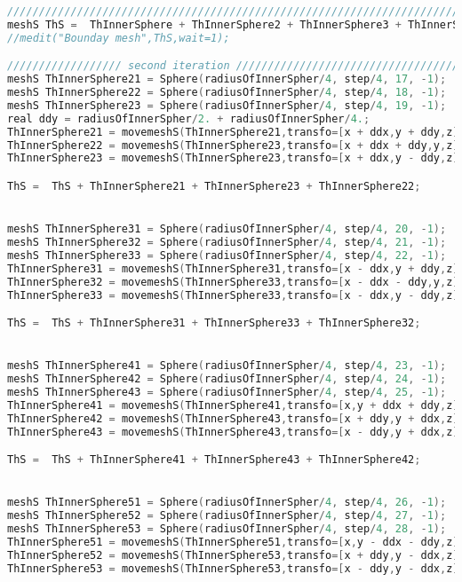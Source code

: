 \begin{lstlisting}[language=C]
/////////////////////////////////////////////////////////////////////////////
meshS ThS =  ThInnerSphere + ThInnerSphere2 + ThInnerSphere3 + ThInnerSphere4 + ThInnerSphere5;
//medit("Bounday mesh",ThS,wait=1);

////////////////// second iteration //////////////////////////////////////////////////////////
meshS ThInnerSphere21 = Sphere(radiusOfInnerSpher/4, step/4, 17, -1);
meshS ThInnerSphere22 = Sphere(radiusOfInnerSpher/4, step/4, 18, -1);
meshS ThInnerSphere23 = Sphere(radiusOfInnerSpher/4, step/4, 19, -1);
real ddy = radiusOfInnerSpher/2. + radiusOfInnerSpher/4.;
ThInnerSphere21 = movemeshS(ThInnerSphere21,transfo=[x + ddx,y + ddy,z]);
ThInnerSphere22 = movemeshS(ThInnerSphere23,transfo=[x + ddx + ddy,y,z]);
ThInnerSphere23 = movemeshS(ThInnerSphere23,transfo=[x + ddx,y - ddy,z]);

ThS =  ThS + ThInnerSphere21 + ThInnerSphere23 + ThInnerSphere22;


meshS ThInnerSphere31 = Sphere(radiusOfInnerSpher/4, step/4, 20, -1);
meshS ThInnerSphere32 = Sphere(radiusOfInnerSpher/4, step/4, 21, -1);
meshS ThInnerSphere33 = Sphere(radiusOfInnerSpher/4, step/4, 22, -1);
ThInnerSphere31 = movemeshS(ThInnerSphere31,transfo=[x - ddx,y + ddy,z]);
ThInnerSphere32 = movemeshS(ThInnerSphere33,transfo=[x - ddx - ddy,y,z]);
ThInnerSphere33 = movemeshS(ThInnerSphere33,transfo=[x - ddx,y - ddy,z]);

ThS =  ThS + ThInnerSphere31 + ThInnerSphere33 + ThInnerSphere32;


meshS ThInnerSphere41 = Sphere(radiusOfInnerSpher/4, step/4, 23, -1);
meshS ThInnerSphere42 = Sphere(radiusOfInnerSpher/4, step/4, 24, -1);
meshS ThInnerSphere43 = Sphere(radiusOfInnerSpher/4, step/4, 25, -1);
ThInnerSphere41 = movemeshS(ThInnerSphere41,transfo=[x,y + ddx + ddy,z]);
ThInnerSphere42 = movemeshS(ThInnerSphere43,transfo=[x + ddy,y + ddx,z]);
ThInnerSphere43 = movemeshS(ThInnerSphere43,transfo=[x - ddy,y + ddx,z]);

ThS =  ThS + ThInnerSphere41 + ThInnerSphere43 + ThInnerSphere42;


meshS ThInnerSphere51 = Sphere(radiusOfInnerSpher/4, step/4, 26, -1);
meshS ThInnerSphere52 = Sphere(radiusOfInnerSpher/4, step/4, 27, -1);
meshS ThInnerSphere53 = Sphere(radiusOfInnerSpher/4, step/4, 28, -1);
ThInnerSphere51 = movemeshS(ThInnerSphere51,transfo=[x,y - ddx - ddy,z]);
ThInnerSphere52 = movemeshS(ThInnerSphere53,transfo=[x + ddy,y - ddx,z]);
ThInnerSphere53 = movemeshS(ThInnerSphere53,transfo=[x - ddy,y - ddx,z]);


\end{lstlisting}
